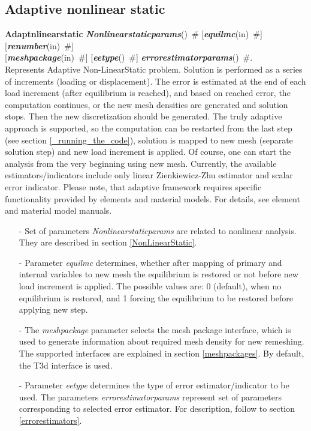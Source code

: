 \documentclass[draft]{article}
\newcommand{\param}[1]{{\em #1}}
\newcommand{\keywordnotype}[1]{\mbox{{\it{\bf{#1}}}}}
\newcommand{\keyword}[2]{\mbox{{\keywordnotype{#1}\tiny (#2)}}}
\newcommand{\entKeywordInst}[1]{\mbox{{\bf{{#1}}}}}
\newcommand{\field}[2]{\mbox{\keyword{#1}{#2}~\#}}
\newcommand{\optField}[2]{\mbox{[\field{#1}{#2}]}}
\begin{document}
\subsection{Adaptive nonlinear static}
\entKeywordInst{Adaptnlinearstatic} \field{Nonlinearstaticparams}{} \optField{equilmc}{in} \optField{renumber}{in}\\ \optField{meshpackage}{in}
\optField{eetype}{} \field{errorestimatorparams}{}.\\
Represents Adaptive Non-LinearStatic problem. Solution is performed  as a series of increments (loading or displacement).
The error is estimated at the end of each load increment (after
equilibrium is reached), and based on reached error, the computation
continues, or the new mesh densities are generated and solution
stops. Then the new discretization should be generated. 
The truly adaptive approach is supported, so the computation can be
restarted from the last step (see section \ref{_running_the_code}), solution is mapped to new mesh (separate
solution step) and new load increment is applied. Of course, one can start the analysis from
the very beginning using new mesh. Currently, the available
estimators/indicators include only linear 
Zienkiewicz-Zhu estimator and scalar error indicator. Please note, that adaptive framework requires
specific functionality provided by elements and material models. For
details, see element and material model manuals.
\begin{itemize}
\item[-]
Set of parameters \param{Nonlinearstaticparams} are related to
nonlinear analysis. They are described in section
\ref{NonLinearStatic}.
\item[-]
Parameter \param{equilmc} determines, whether after mapping of primary
and internal variables to new mesh the equilibrium is restored or not
before new load increment is applied. The possible values are: 0
(default), when no equilibrium is restored, and 1 forcing the
equilibrium to be restored before applying new step.
\item[-]
The \param{meshpackage} parameter selects the mesh package interface,
which is used to generate information about required mesh density for
new remeshing. The supported interfaces are explained in section
\ref{meshpackages}. By default, the T3d interface is used.
\item[-]
Parameter \param{eetype} determines the type of error
estimator/indicator to be used. The parameters
\param{errorestimatorparams} represent set of parameters corresponding
to selected error estimator. For description, follow to section
\ref{errorestimators}.
\end{itemize}
%
\end{document}

